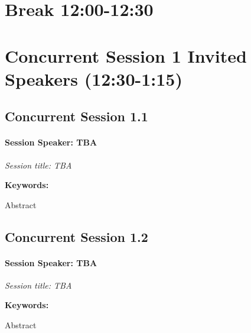 \documentclass[
]{book}
\begin{document}
\hypertarget{break-1200-1230}{%
\section*{Break \textbar{} 12:00-12:30}\label{break-1200-1230}}

\hypertarget{concurrent-session-1-invited-speakers-1230-115}{%
\section*{Concurrent Session 1 \textbar{} Invited Speakers (12:30-1:15)}\label{concurrent-session-1-invited-speakers-1230-115}}

\hypertarget{concurrent-session-1.1}{%
\subsection*{Concurrent Session 1.1}\label{concurrent-session-1.1}}

\begin{speaker}
\hypertarget{session-speaker-tba}{%
\paragraph{\texorpdfstring{Session Speaker:
\textbf{TBA}}{Session Speaker: TBA}}\label{session-speaker-tba}}

\emph{Session title: TBA}

\textbf{Keywords:}

Abstract
\end{speaker}

\hypertarget{concurrent-session-1.2}{%
\subsection*{Concurrent Session 1.2}\label{concurrent-session-1.2}}

\begin{speaker}
\hypertarget{session-speaker-tba}{%
\paragraph{\texorpdfstring{Session Speaker:
\textbf{TBA}}{Session Speaker: TBA}}\label{session-speaker-tba}}

\emph{Session title: TBA}

\textbf{Keywords:}

Abstract
\end{speaker}
\end{document}

